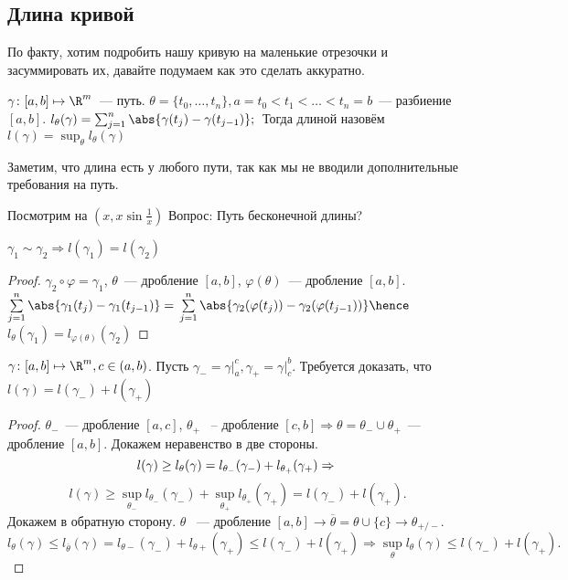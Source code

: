 \subsection{Длина кривой}
\begin{remark}
    По факту, хотим подробить нашу кривую на маленькие отрезочки
    и засуммировать их, давайте подумаем как это сделать аккуратно.
\end{remark}
\begin{definition}
    $\gamma\colon [a, b]\mapsto \R^m$~--- путь.
    $\theta = \{t_0,\dots, t_n\}, a = t_0 < t_1 < \dots < t_n = b$~---
    разбиение $[a, b]$.
    $l_\theta(\gamma) = \sum_{j = 1}^{n}
    \abs{\gamma(t_j) - \gamma(t_{j - 1})};\\$
    Тогда длиной назовём  $l(\gamma) = \sup_\theta l_\theta(\gamma)$
\end{definition}
\begin{remark}
    Заметим, что длина есть у любого пути, так как мы не вводили
    дополнительные требования на путь.
\end{remark}
\begin{remark}
    Посмотрим на $(x, x\sin \frac{1}{x})$
    Вопрос: Путь бесконечной длины?
\end{remark}
\begin{theorem}
    $\gamma_1 \sim \gamma_2\Rightarrow l(\gamma_1) = l(\gamma_2)$
\end{theorem}
\begin{proof}
    $\gamma_2\circ\varphi=\gamma_1$,
    $\theta$~--- дробление $[a,b]$,
    $\varphi(\theta)$~--- дробление $[a,b]$.
    $\sum\limits_{j = 1}^{n}\abs{\gamma_1(t_j) - \gamma_1(t_{j-1})}=\\
    \sum\limits_{j=1}^{n}\abs{\gamma_2(\varphi(t_j))-\gamma_2(\varphi(t_{j-1}))} \hence$ 
    $l_{\theta}(\gamma_1) = l_{\varphi(\theta)}(\gamma_2)$
\end{proof}
\begin{theorem}
    $\gamma\colon [a,b]\mapsto\R^m, c\in(a,b)$.
    Пусть $\gamma_{-}=\gamma\big|_a^c, \gamma_{+} = \gamma\big|_c^b$.
    Требуется доказать, что $l(\gamma)=l(\gamma_-) + l(\gamma_+)$
\end{theorem}
\begin{proof}
    $\theta_-$~--- дробление $[a,c]$, $\theta_+$ ~-- дробление
    $[c,b]\Rightarrow \theta = \theta_- \cup \theta_+$~---
    дробление $[a,b]$.
    Докажем неравенство в две стороны.
    \[
        l(\gamma)\geq l_{\theta}(\gamma) = l_{\theta_-}(\gamma_-) + l_{\theta_+}(\gamma_+)\Rightarrow\\
    \]\[
        l(\gamma)\ge \sup_{\theta_-}l_{\theta_-}(\gamma_-) + 
        \sup_{\theta_+}l_{\theta_+}(\gamma_+) = l(\gamma_-) + l(\gamma_+)
    .\] 
    Докажем в обратную сторону.
    $\theta$ ~--- дробление $[a,b]\rightarrow 
    \overline{\theta} = \theta \cup \{c\}\rightarrow \theta_{+/-}$.
    \[
        l_{\theta}(\gamma)\leq l_{\overline{\theta}}(\gamma) =
        l_{\theta-}(\gamma_-) + l_{\theta+}(\gamma_+)\leq
        l(\gamma_-)+l(\gamma_+)\Rightarrow 
        \sup_{\theta}l_{\theta}(\gamma)\leq l(\gamma_-) + l(\gamma_+)
    .\] 
\end{proof}
